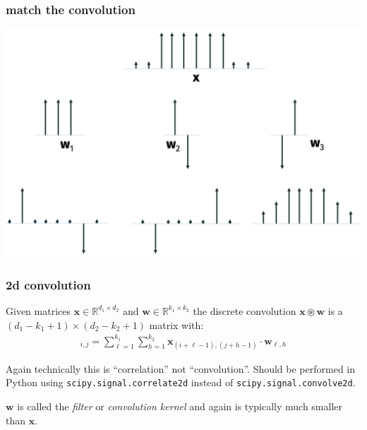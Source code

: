 \documentclass[handout,compress]{beamer}
\newcommand{\bv}[1]{\mathbf{#1}}
\newcommand{\R}{\mathbb{R}}
\begin{document}
	\begin{frame}
	\frametitle{match the convolution}
	\includegraphics[width=\textwidth]{match.png}
	\end{frame}

	\begin{frame}
		\frametitle{2d convolution}
			\small
			\begin{definition}
				Given matrices $\bv{x} \in \R^{d_1\times d_2}$ and $\bv{w} \in \R^{k_1\times k_2}$ the discrete convolution $\bv{x}\circledast \bv{w}$ is a $(d_1 - k_1 + 1)\times (d_2 - k_2 + 1)$ matrix with:
				\vspace{-1em}
				\begin{align*}
				[\bv{x}\circledast \bv{w}]_{i,j} = \sum_{\ell=1}^{k_1}\sum_{h=1}^{k_2} \bv{x}_{(i + \ell -1),(j + h -1)}\cdot \bv{w}_{\ell,h}
				\end{align*}
				\vspace{-1em}
			\end{definition}
		
		Again technically this is ``correlation'' not ``convolution''. Should be performed in Python using \texttt{scipy.signal.correlate2d} instead of \texttt{scipy.signal.convolve2d}.
		
		$\bv{w}$ is called the \emph{filter} or \emph{convolution kernel} and again is typically much smaller than $\bv{x}$. 
	\end{frame}
\end{document}
